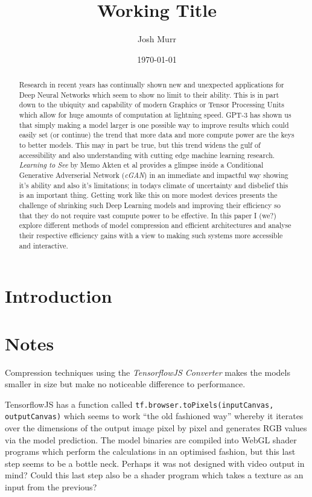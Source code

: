 \documentclass[a4paper]{article}
\title{ Working Title }
\date{\today}
\author{Josh Murr}
\begin{document}
\maketitle

\begin{abstract}
  Research in recent years has continually shown new and unexpected applications for Deep Neural Networks which seem to show no limit to their ability. This is in part down to the ubiquity and capability of modern Graphics or Tensor Processing Units which allow for huge amounts of computation at lightning speed. GPT-3 has shown us that simply making a model larger is one possible way to improve results\cite{2005.14165} which could easily set (or continue) the trend that more data and more compute power are the keys to better models. This may in part be true, but this trend widens the gulf of accessibility and also understanding with cutting edge machine learning research. \textit{Learning to See} by Memo Akten et al\cite{2003.00902} provides a glimpse inside a Conditional Generative Adverserial Network (\textit{cGAN}) in an immediate and impactful way showing it's ability and also it's limitations; in todays climate of uncertainty and disbelief this is an important thing. Getting work like this on more modest devices presents the challenge of shrinking such Deep Learning models and improving their efficiency so that they do not require vast compute power to be effective. In this paper I (we?) explore different methods of model compression and efficient architectures and analyse their respective efficiency gains with a view to making such systems more accessible and interactive.
\end{abstract}

\section{Introduction}

\section{Notes}
Compression techniques using the \textit{TensorflowJS Converter} makes the models smaller in size but make no noticeable difference to performance.

TensorflowJS has a function called \texttt{tf.browser.toPixels(inputCanvas, outputCanvas)} which seems to work ``the old fashioned way'' whereby it iterates over the dimensions of the output image pixel by pixel and generates RGB values via the model prediction. The model binaries are compiled into WebGL shader programs which perform the calculations in an optimised fashion, but this last step seems to be a bottle neck. Perhaps it was not designed with video output in mind? Could this last step also be a shader program which takes a texture as an input from the previous?
\end{document}
